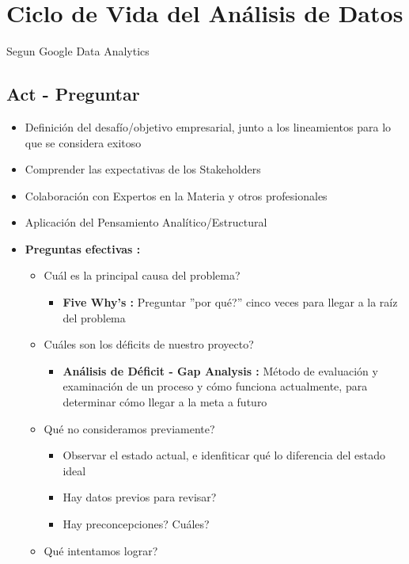 \section{Ciclo de Vida del Análisis de Datos}
Segun Google Data Analytics

\subsection{Act - Preguntar}
\begin{itemize}
    \item {Definición del desafío/objetivo empresarial, junto a los lineamientos para lo que se considera exitoso}
    \item {Comprender las expectativas de los Stakeholders}
    \item {Colaboración con Expertos en la Materia y otros profesionales}
    \item {Aplicación del Pensamiento Analítico/Estructural}
    \item {\textbf{Preguntas efectivas : }
    \begin{itemize}
        \item {Cuál es la principal causa del problema?}
        \begin{itemize}
            \item {\textbf{Five Why's : }Preguntar ''por qué?'' cinco veces para llegar a la raíz del problema}
        \end{itemize}
        \item {Cuáles son los déficits de nuestro proyecto?}
        \begin{itemize}
            \item {\textbf{Análisis de Déficit - Gap Analysis : }Método de evaluación y examinación de un proceso y cómo funciona actualmente, para determinar cómo llegar a la meta a futuro}
        \end{itemize}
        \item {Qué no consideramos previamente?}
        \begin{itemize}
            \item {Observar el estado actual, e idenfiticar qué lo diferencia del estado ideal}
            \item {Hay datos previos para revisar?}
            \item {Hay preconcepciones? Cuáles?}
        \end{itemize}
        \item{Qué intentamos lograr?}
    \end{itemize}}
\end{itemize}

